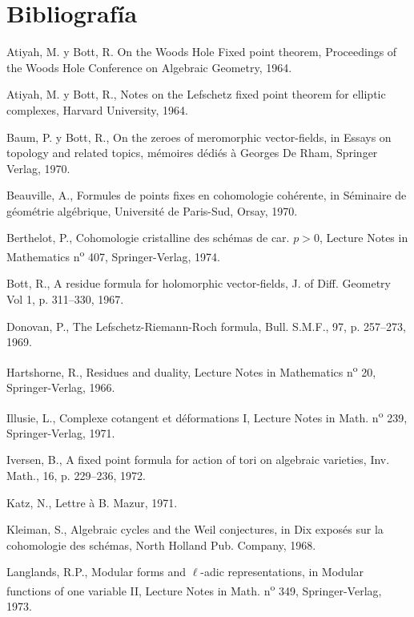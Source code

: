 \section*{Bibliografía}
\begin{enumerate}[label={[\arabic*]},leftmargin=3.5em]
\item Atiyah, M. y Bott, R. On the Woods Hole Fixed point theorem, Proceedings of the Woods Hole Conference on Algebraic Geometry, 1964.
\item Atiyah, M. y Bott, R., Notes on the Lefschetz fixed point theorem for elliptic complexes, Harvard University, 1964.
\item Baum, P. y Bott, R., On the zeroes of meromorphic vector-fields, in Essays on topology and related topics, mémoires dédiés à Georges De Rham, Springer Verlag, 1970.
\item Beauville, A., Formules de points fixes en cohomologie cohérente, in Séminaire de géométrie algébrique, Université de Paris-Sud, Orsay, 1970.
\item Berthelot, P., Cohomologie cristalline des schémas de car. $p>0$, Lecture Notes in Mathematics n\textsuperscript{o} 407, Springer-Verlag, 1974.
\item Bott, R., A residue formula for holomorphic vector-fields, J. of Diff. Geometry Vol 1, p. 311--330, 1967.
\item Donovan, P., The Lefschetz-Riemann-Roch formula, Bull. S.M.F., 97, p. 257--273, 1969.
\item Hartshorne, R., Residues and duality, Lecture Notes in Mathematics n\textsuperscript{o} 20, Springer-Verlag, 1966.
\item Illusie, L., Complexe cotangent et déformations I, Lecture Notes in Math. n\textsuperscript{o} 239, Springer-Verlag, 1971.
\item Iversen, B., A fixed point formula for action of tori on algebraic varieties, Inv. Math., 16, p. 229--236, 1972.
\item Katz, N., Lettre à B. Mazur, 1971.
\item Kleiman, S., Algebraic cycles and the Weil conjectures, in Dix exposés sur la cohomologie des schémas, North Holland Pub. Company, 1968.
\item Langlands, R.P., Modular forms and $\ell$-adic representations, in Modular functions of one variable II, Lecture Notes in Math. n\textsuperscript{o} 349, Springer-Verlag, 1973.

\end{enumerate}
